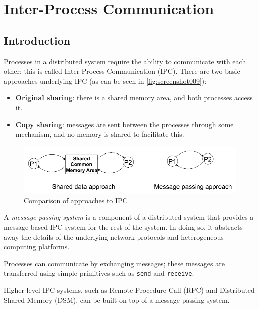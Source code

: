 \chapter{Inter-Process Communication}
\section{Introduction}
Processes in a distributed system require the ability to communicate with each other; this is called Inter-Process Communication (IPC). There are two basic approaches underlying IPC (as can be seen in \autoref{fig:screenshot009}):
\begin{itemize}
\item \textbf{Original sharing}: there is a shared memory area, and both processes access it.
\item \textbf{Copy sharing}: messages are sent between the processes through some mechanism, and no memory is shared to facilitate this.
\end{itemize}

\begin{figure}[h]
\centering
\includegraphics[width=0.7\linewidth]{figures/screenshot009}
\caption{Comparison of approaches to IPC}
\label{fig:screenshot009}
\end{figure}

A \textit{message-passing system} is a component of a distributed system that provides a message-based IPC system for the rest of the system. In doing so, it abstracts away the details of the underlying network protocols and heterogeneous computing platforms.

Processes can communicate by exchanging messages; these messages are transferred using simple primitives such as \texttt{send} and \texttt{receive}.

Higher-level IPC systems, such as Remote Procedure Call (RPC) and Distributed Shared Memory (DSM), can be built on top of a message-passing system.

